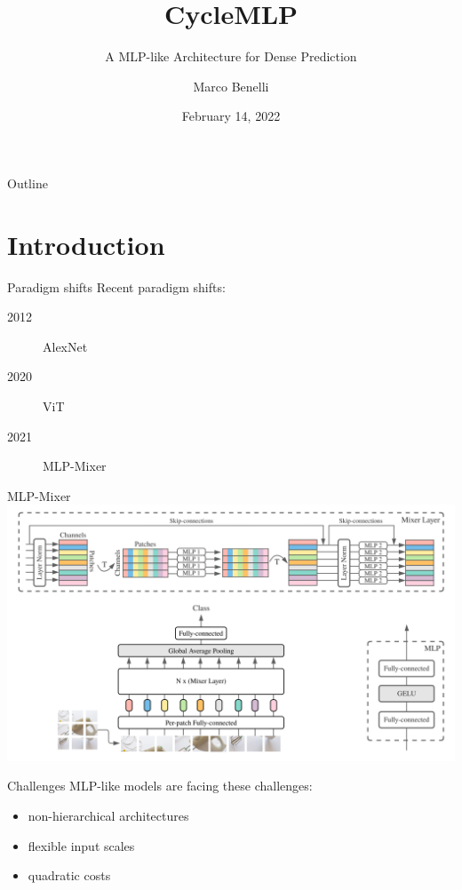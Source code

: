 \documentclass{beamer}
\title{CycleMLP}
\subtitle{A MLP-like Architecture for Dense Prediction}
\author{Marco Benelli}
\institute{University of Florence}
\date{February 14, 2022}
\begin{document}
\begin{frame}
    \titlepage
\end{frame}

\begin{frame}{Outline}
    \tableofcontents
\end{frame}

\section{Introduction}

\begin{frame}{Paradigm shifts}
    Recent paradigm shifts:
    \begin{description}
        \item[2012] AlexNet
        \item[2020] ViT
        \item[2021] MLP-Mixer
    \end{description}
\end{frame}

\begin{frame}{MLP-Mixer}
    \includegraphics[width=\textwidth]{figures/mixer_figure.png}
\end{frame}

\begin{frame}{Challenges}
    MLP-like models are facing these challenges:
    \begin{itemize}
        \item non-hierarchical architectures
        \item flexible input scales
        \item quadratic costs
    \end{itemize}
\end{frame}
\end{document}
